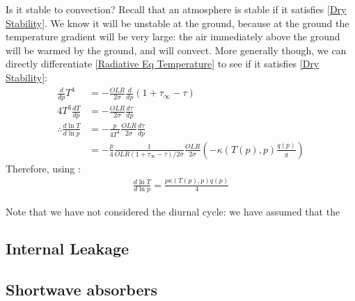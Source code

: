 Is it stable to convection? Recall that an atmosphere is stable if it satisfies \ref{Dry Stability}. We know it will be unstable at the ground, because at the ground the temperature gradient will be very large: the air immediately above the ground will be warmed by the ground, and will convect. More generally though, we can directly differentiate \ref{Radiative Eq Temperature} to see if it satisfies \ref{Dry Stability}:
\begin{align*}
    \frac{d}{dp}T^4&=-\frac{OLR}{2\sigma}\frac{d}{dp}(1+\tau_\infty-\tau)\\
    4T^3\frac{dT}{dp}&=-\frac{OLR}{2\sigma}\frac{d\tau}{dp}\\
    \therefore
    \frac{d\ln T}{d\ln p}&=-\frac{p}{4T^4}\frac{OLR}{2\sigma}\frac{d\tau}{dp}\\
    &=-\frac{p}{4}\frac{1}{OLR(1+\tau_\infty-\tau)/2\sigma}\frac{OLR}{2\sigma}
    \left( -\kappa(T(p),p) \frac{q(p)}{g} \right)
\end{align*}
Therefore, using :
\begin{align}
    \frac{d\ln T}{d\ln p} = \frac{p\kappa(T(p),p)q(p)}{4}
\end{align}

Note that we have not considered the diurnal cycle: we have assumed that the 


\subsection{Internal Leakage}

\subsection{Shortwave absorbers}\label{Shortwave}